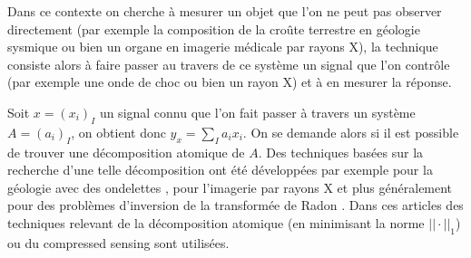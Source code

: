 \begin{exemple}
	Dans ce contexte on cherche à mesurer un objet que l'on ne peut pas observer directement (par exemple la composition de la croûte terrestre en géologie sysmique ou bien un organe en imagerie médicale par rayons X), la technique consiste alors à faire passer au travers de ce système un signal que l'on contrôle (par exemple une onde de choc ou bien un rayon X) et à en mesurer la réponse.

	Soit $x=(x_i)_I$ un signal connu que l'on fait passer à travers un système $A = (a_i)_I$, on obtient donc $y_x = \sum_I a_i x_i$.
	On se demande alors si il est possible de trouver une décomposition atomique de $A$.
	Des techniques basées sur la recherche d'une telle décomposition ont été développées par exemple pour la géologie avec des ondelettes \cite{TomoInv}, pour l'imagerie par rayons X \cite{CSTom} \cite{XraySparse} et plus généralement pour des problèmes d'inversion de la transformée de Radon \cite{RobustSparseRadon} \cite{ViewsSparseRadon}.
	Dans ces articles des techniques relevant de la décomposition atomique (en minimisant la norme $||\cdot||_1$) ou du compressed sensing sont utilisées.
\end{exemple}
